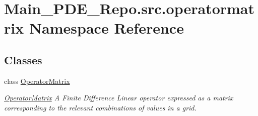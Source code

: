\hypertarget{namespaceMain__PDE__Repo_1_1src_1_1operatormatrix}{}\section{Main\+\_\+\+P\+D\+E\+\_\+\+Repo.\+src.\+operatormatrix Namespace Reference}
\label{namespaceMain__PDE__Repo_1_1src_1_1operatormatrix}
\subsection*{Classes}
\begin{DoxyCompactItemize}
\item 
class \hyperlink{classMain__PDE__Repo_1_1src_1_1operatormatrix_1_1OperatorMatrix}{Operator\+Matrix}
\begin{DoxyCompactList}\small\item\em \hyperlink{classMain__PDE__Repo_1_1src_1_1operatormatrix_1_1OperatorMatrix}{Operator\+Matrix} A Finite Difference Linear operator expressed as a matrix corresponding to the relevant combinations of values in a grid. \end{DoxyCompactList}\end{DoxyCompactItemize}
